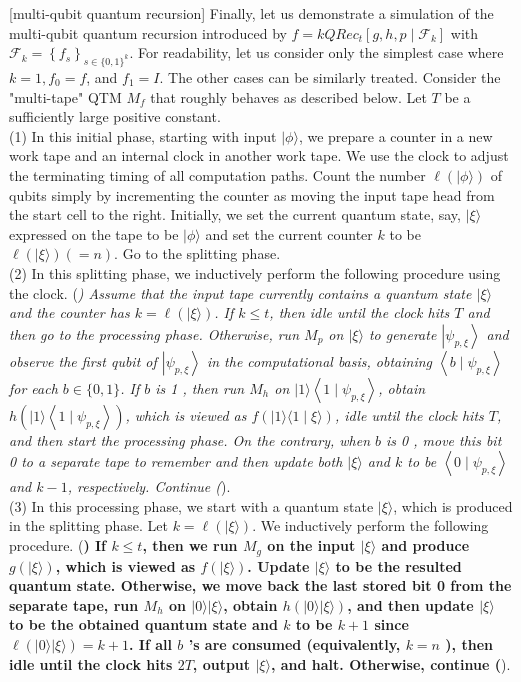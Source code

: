 \documentclass[10pt]{article}
\begin{document}
[multi-qubit quantum recursion] Finally, let us demonstrate a simulation of the multi-qubit quantum recursion introduced by $f=k Q R e c_{t}\left[g, h, p \mid \mathcal{F}_{k}\right]$ with $\mathcal{F}_{k}=\left\{f_{s}\right\}_{s \in\{0,1\}^{k}}$. For readability, let us consider only the simplest case where $k=1, f_{0}=f$, and $f_{1}=I$. The other cases can be similarly treated. Consider the "multi-tape" QTM $M_{f}$ that roughly behaves as described below. Let $T$ be a sufficiently large positive constant.\\
(1) In this initial phase, starting with input $|\phi\rangle$, we prepare a counter in a new work tape and an internal clock in another work tape. We use the clock to adjust the terminating timing of all computation paths. Count the number $\ell(|\phi\rangle)$ of qubits simply by incrementing the counter as moving the input tape head from the start cell to the right. Initially, we set the current quantum state, say, $|\xi\rangle$ expressed on the tape to be $|\phi\rangle$ and set the current counter $k$ to be $\ell(|\xi\rangle)(=n)$. Go to the splitting phase.\\
(2) In this splitting phase, we inductively perform the following procedure using the clock. (\textit{) Assume that the input tape currently contains a quantum state $|\xi\rangle$ and the counter has $k=\ell(|\xi\rangle)$. If $k \leq t$, then idle until the clock hits $T$ and then go to the processing phase. Otherwise, run $M_{p}$ on $|\xi\rangle$ to generate $\left|\psi_{p, \xi}\right\rangle$ and observe the first qubit of $\left|\psi_{p, \xi}\right\rangle$ in the computational basis, obtaining $\left\langle b \mid \psi_{p, \xi}\right\rangle$ for each $b \in\{0,1\}$. If $b$ is 1 , then run $M_{h}$ on $|1\rangle\left\langle 1 \mid \psi_{p, \xi}\right\rangle$, obtain $h\left(|1\rangle\left\langle 1 \mid \psi_{p, \xi}\right\rangle\right)$, which is viewed as $f(|1\rangle\langle 1 \mid \xi\rangle)$, idle until the clock hits $T$, and then start the processing phase. On the contrary, when $b$ is 0 , move this bit 0 to a separate tape to remember and then update both $|\xi\rangle$ and $k$ to be $\left\langle 0 \mid \psi_{p, \xi}\right\rangle$ and $k-1$, respectively. Continue (}).\\
(3) In this processing phase, we start with a quantum state $|\xi\rangle$, which is produced in the splitting phase. Let $k=\ell(|\xi\rangle)$. We inductively perform the following procedure. (\textbf{) If $k \leq t$, then we run $M_{g}$ on the input $|\xi\rangle$ and produce $g(|\xi\rangle)$, which is viewed as $f(|\xi\rangle)$. Update $|\xi\rangle$ to be the resulted quantum state. Otherwise, we move back the last stored bit 0 from the separate tape, run $M_{h}$ on $|0\rangle|\xi\rangle$, obtain $h(|0\rangle|\xi\rangle)$, and then update $|\xi\rangle$ to be the obtained quantum state and $k$ to be $k+1$ since $\ell(|0\rangle|\xi\rangle)=k+1$. If all $b$ 's are consumed (equivalently, $k=n$ ), then idle until the clock hits $2 T$, output $|\xi\rangle$, and halt. Otherwise, continue (}).
\end{document}
